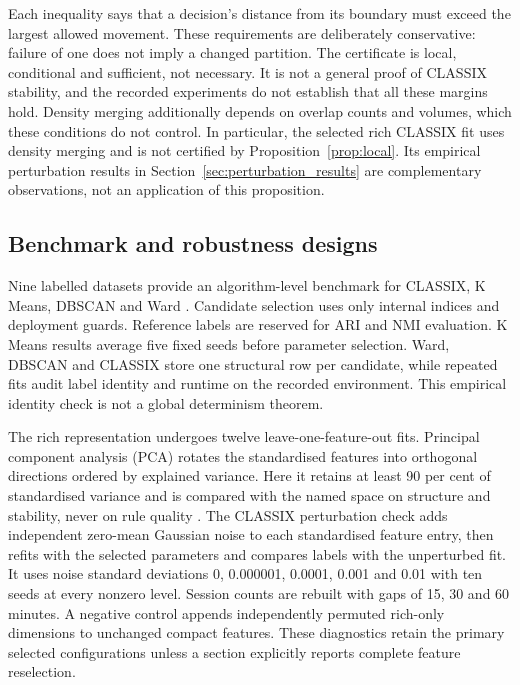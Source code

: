 Each inequality says that a decision's distance from its boundary must exceed the largest allowed movement. These requirements are deliberately conservative: failure of one does not imply a changed partition. The certificate is local, conditional and sufficient, not necessary. It is not a general proof of CLASSIX stability, and the recorded experiments do not establish that all these margins hold. Density merging additionally depends on overlap counts and volumes, which these conditions do not control. In particular, the selected rich CLASSIX fit uses density merging and is not certified by Proposition~\ref{prop:local}. Its empirical perturbation results in Section~\ref{sec:perturbation_results} are complementary observations, not an application of this proposition.

\subsection{Benchmark and robustness designs}

Nine labelled datasets provide an algorithm-level benchmark for CLASSIX, K Means, DBSCAN and Ward \citep{ester1996dbscan,ward1963hierarchical}. Candidate selection uses only internal indices and deployment guards. Reference labels are reserved for ARI and NMI evaluation. K Means results average five fixed seeds before parameter selection. Ward, DBSCAN and CLASSIX store one structural row per candidate, while repeated fits audit label identity and runtime on the recorded environment. This empirical identity check is not a global determinism theorem.

The rich representation undergoes twelve leave-one-feature-out fits. Principal component analysis (PCA) rotates the standardised features into orthogonal directions ordered by explained variance. Here it retains at least 90 per cent of standardised variance and is compared with the named space on structure and stability, never on rule quality \citep{pearson1901pca,hotelling1933pca}. The CLASSIX perturbation check adds independent zero-mean Gaussian noise to each standardised feature entry, then refits with the selected parameters and compares labels with the unperturbed fit. It uses noise standard deviations 0, 0.000001, 0.0001, 0.001 and 0.01 with ten seeds at every nonzero level. Session counts are rebuilt with gaps of 15, 30 and 60 minutes. A negative control appends independently permuted rich-only dimensions to unchanged compact features. These diagnostics retain the primary selected configurations unless a section explicitly reports complete feature reselection.
